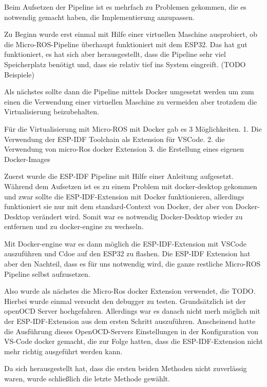 \begin{flushleft}
    Beim Aufsetzen der Pipeline ist es mehrfach zu Problemen gekommen, die es notwendig gemacht haben, die Implementierung anzupassen.

    Zu Beginn wurde erst einmal mit Hilfe einer virtuellen Maschine ausprobiert, ob die Micro-ROS-Pipeline überhaupt funktioniert mit dem ESP32.
    Das hat gut funktioniert, es hat sich aber herausgestellt, dass die Pipeline sehr viel Speicherplatz benötigt und, dass sie relativ tief ins System eingreift. (TODO Beispiele)
    
    Als nächstes sollte dann die Pipeline mittels Docker umgesetzt werden um zum einen die Verwendung einer virtuellen Maschine zu vermeiden aber trotzdem die Virtualisierung beizubehalten.

    Für die Virtualisierung mit Micro-ROS mit Docker gab es 3 Möglichkeiten. 
    1. Die Verwendung der ESP-IDF Toolchain als Extension für VSCode.
    2. die Verwendung von micro-Ros docker Extension
    3. die Erstellung eines eigenen Docker-Images

    Zuerst wurde die ESP-IDF Pipeline mit Hilfe einer Anleitung aufgesetzt. 
    Während dem Aufsetzen ist es zu einem Problem mit docker-desktop gekommen und zwar sollte die ESP-IDF-Extension mit Docker funktionieren, allerdings funktioniert sie nur mit dem standard-Context von Docker, der aber von Docker-Desktop verändert wird.
    Somit war es notwendig Docker-Desktop wieder zu entfernen und zu docker-engine zu wechseln.

    Mit Docker-engine war es dann möglich die ESP-IDF-Extension mit VSCode auszuführen und Cdoe auf den ESP32 zu flashen.
    Die ESP-IDF Extension hat aber den Nachteil, dass es für uns notwendig wird, die ganze restliche Micro-ROS Pipeline selbst aufzusetzen.

    Also wurde als nächstes die Micro-Ros docker Extension verwendet, die TODO.
    Hierbei wurde einmal versucht den debugger zu testen. Grundsätzlich ist der openOCD Server hochgefahren. Allerdings war es danach nicht merh möglich mit der ESP-IDF-Extension aus dem ersten Schritt auszuführen. 
    Anscheinend hatte die Ausführung dieses OpenOCD-Servers Einstellungen in der Konfiguration von VS-Code docker gemacht, die zur Folge hatten, dass die ESP-IDF-Extension nicht mehr richtig ausgeführt werden kann.

    Da sich herausgestellt hat, dass die ersten beiden Methoden nicht zuverlässig waren, wurde schließlich die letzte Methode gewählt.
\end{flushleft}